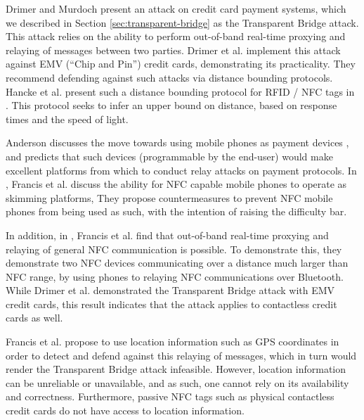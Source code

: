 
Drimer and Murdoch \cite{Drimer:2007:KYE:1362903.1362910} present an attack on credit card payment systems,
    which we described in Section \ref{sec:transparent-bridge} as the Transparent Bridge attack.
This attack relies on the ability to perform out-of-band real-time proxying and relaying of messages between two parties.
Drimer et al. implement this attack against EMV (``Chip and Pin'') credit cards, demonstrating its practicality.
They recommend defending against such attacks via distance bounding protocols.
Hancke et al. present such a distance bounding protocol for RFID / NFC tags in \cite{hancke2005rfid}.
    This protocol seeks to infer an upper bound on distance, based on response times and the speed of light.

Anderson discusses the move towards using mobile phones as payment devices \cite{anderson2007position},
    and predicts that such devices (programmable by the end-user) would make excellent platforms from which to conduct relay attacks on payment protocols.
In \cite{francis2010security}, Francis et al. discuss the ability for NFC capable mobile phones to operate as skimming platforms,
They propose countermeasures to prevent NFC mobile phones from being used as such, with the intention of raising the difficulty bar.

In addition, in \cite{francis2010practical}, Francis et al. find that out-of-band real-time proxying and relaying of general NFC communication is possible.
To demonstrate this, they demonstrate two NFC devices communicating over a distance much larger than NFC range,
    by using phones to relaying NFC communications over Bluetooth.
While Drimer et al. demonstrated the Transparent Bridge attack with EMV credit cards,
    this result indicates that the attack applies to contactless credit cards as well.

Francis et al. propose to use location information such as GPS coordinates in order to detect and defend against this relaying of messages,
    which in turn would render the Transparent Bridge attack infeasible.
However, location information can be unreliable or unavailable, and as such, one cannot rely on its availability and correctness.
Furthermore, passive NFC tags such as physical contactless credit cards do not have access to location information.

